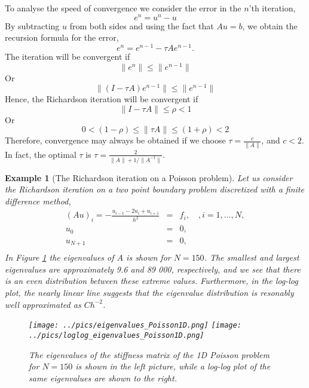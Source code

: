 \documentclass[a4paper,11pt]{amsart}
\newtheorem{example}{Example}[section]
\begin{document}
To analyse the speed of convergence we consider the error
in the $n$'th iteration,
\[
e^n = u^n - u
\]
By subtracting $u$ from both sides and using the fact that $Au=b$, we
obtain the recursion formula for the error,
\[
e^n = e^{n-1} - \tau A e^{n-1}.
\]
The iteration will be convergent if
\[
\|e^n\| \le \|e^{n-1}\|
\]
Or
\[
\|(I - \tau A) e^{n-1}\| \le \|e^{n-1}\|
\]
Hence, the Richardson iteration will be convergent if
\[
\|I - \tau A\| \le \rho < 1
\]
Or
\[
0 < (1-\rho) \le \|\tau A\| \le (1+\rho) < 2
\]
Therefore, convergence may always be obtained if we choose
$\tau = \frac{c}{\|A\|}$, and $c<2$. In fact, the
optimal $\tau$ is
$\tau = \frac{2}{\|A\| + 1/\|A^{-1}\|}$.

\begin{example}[The Richardson iteration on a Poisson problem]
Let us consider the Richardson iteration on a two point
boundary problem discretized with a finite difference method,
\begin{eqnarray*}
(A u)_i = -\frac{u_{i-1} - 2 u_i + u_{i+1}}{h^2} &=& f_i, \quad, i=1,\ldots, N, \\
                                  u_0  &=& 0, \\
                                  u_{N+1}  &=& 0, \\
\end{eqnarray*}
In Figure \ref{Poisson1D:eig} the eigenvalues of $A$ is shown for $N=150$.
The smallest and largest eigenvalues are approximately 9.6 and 89 000, respectively,
and we see that there is an even distribution between these extreme values.
Furthermore, in the log-log plot, the nearly linear line suggests that
the eigenvalue distribution is resonably well approximated as $ C h^{-2}$.
\begin{figure}[h]
\begin{center}
\label{Poisson1D:eig}
\texttt{[image: ../pics/eigenvalues\_Poisson1D.png]}
\texttt{[image: ../pics/loglog\_eigenvalues\_Poisson1D.png]}
\caption{The eigenvalues of the stiffness matrix of the 1D Poisson problem for $N=150$
is shown in the left picture, while a log-log plot of the same eigenvalues are shown
to the right.}
\end{center}
\end{figure}


\end{example}
\end{document}
